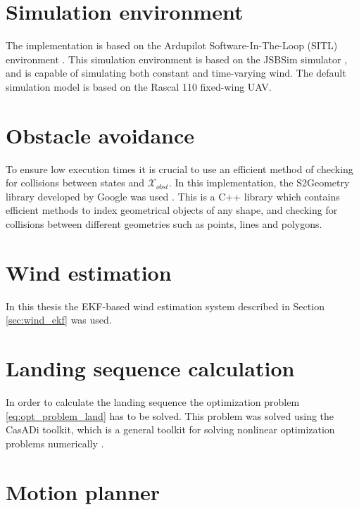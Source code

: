 \section{Simulation environment}
The implementation is based on the Ardupilot Software-In-The-Loop (SITL) environment \cite{ardupilot_sitl}. This simulation environment is based on the 
JSBSim simulator \cite{jsbsim}, and is capable of simulating both constant and time-varying wind. The default simulation model is based on the 
Rascal 110 fixed-wing UAV.
\section{Obstacle avoidance}
To ensure low execution times it is crucial to use an efficient method of checking for collisions between states and $\mathcal{X}_{obst}$. 
In this implementation, the S2Geometry library developed by Google was used \cite{s2geo}. This is a C++ library which contains 
efficient methods to index geometrical objects of any shape, and checking for collisions between different geometries such as points, lines and polygons. 
\section{Wind estimation}
In this thesis the EKF-based wind estimation system described in Section \ref{sec:wind_ekf} was used.
\section{Landing sequence calculation}
In order to calculate the landing sequence the optimization problem \eqref{eq:opt_problem_land} has to be solved. 
This problem was solved using the CasADi toolkit, which is a general toolkit for solving nonlinear optimization problems numerically \cite{casadi}.
\section{Motion planner} 
